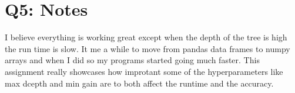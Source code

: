 \documentclass[11pt]{article}
\begin{document}
\section{Q5: Notes}
I believe everything is working great except when the depth of the tree is high the run time is slow. It me a while to move from pandas data frames to numpy arrays and when I did so my programs started going much faster. This assignment really showcases how improtant some of the hyperparameters like max dcepth and min gain are to both affect the runtime and the  accuracy. 
\end{document}
